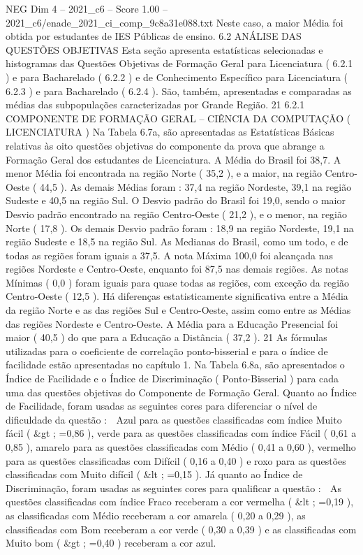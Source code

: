 \begin{textsample}{NEG Dim 4 – 2021\_c6 – Score 1.00 – 2021\_c6/enade\_2021\_ci\_comp\_9c8a31e088.txt}
Neste caso, a maior Média foi obtida por estudantes de IES Públicas de ensino. 6.2 ANÁLISE DAS QUESTÕES OBJETIVAS Esta seção apresenta estatísticas selecionadas e histogramas das Questões Objetivas de Formação Geral para Licenciatura ( 6.2.1 ) e para Bacharelado ( 6.2.2 ) e de Conhecimento Específico para Licenciatura ( 6.2.3 ) e para Bacharelado ( 6.2.4 ).
São, também, apresentadas e comparadas as médias das subpopulações caracterizadas por Grande Região. 21 6.2.1 COMPONENTE DE FORMAÇÃO GERAL – CIÊNCIA DA COMPUTAÇÃO ( LICENCIATURA ) Na Tabela 6.7a, são apresentadas as Estatísticas Básicas relativas às oito questões objetivas do componente da prova que abrange a Formação Geral dos estudantes de Licenciatura.
A Média do Brasil foi 38,7.
A menor Média foi encontrada na região Norte ( 35,2 ), e a maior, na região Centro-Oeste ( 44,5 ).
As demais Médias foram : 37,4 na região Nordeste, 39,1 na região Sudeste e 40,5 na região Sul.
O Desvio padrão do Brasil foi 19,0, sendo o maior Desvio padrão encontrado na região Centro-Oeste ( 21,2 ), e o menor, na região Norte ( 17,8 ).
Os demais Desvio padrão foram : 18,9 na região Nordeste, 19,1 na região Sudeste e 18,5 na região Sul.
As Medianas do Brasil, como um todo, e de todas as regiões foram iguais a 37,5.
A nota Máxima 100,0 foi alcançada nas regiões Nordeste e Centro-Oeste, enquanto foi 87,5 nas demais regiões.
As notas Mínimas ( 0,0 ) foram iguais para quase todas as regiões, com exceção da região Centro-Oeste ( 12,5 ).
Há diferenças estatisticamente significativa entre a Média da região Norte e as das regiões Sul e Centro-Oeste, assim como entre as Médias das regiões Nordeste e Centro-Oeste.
A Média para a Educação Presencial foi maior ( 40,5 ) do que para a Educação a Distância ( 37,2 ). 21 As fórmulas utilizadas para o coeficiente de correlação ponto-bisserial e para o índice de facilidade estão apresentadas no capítulo 1.
Na Tabela 6.8a, são apresentados o Índice de Facilidade e o Índice de Discriminação ( Ponto-Bisserial ) para cada uma das questões objetivas do Componente de Formação Geral.
Quanto ao Índice de Facilidade, foram usadas as seguintes cores para diferenciar o nível de dificuldade da questão :  Azul para as questões classificadas com índice Muito fácil ( \&gt ; =0,86 ), verde para as questões classificadas com índice Fácil ( 0,61 a 0,85 ), amarelo para as questões classificadas com Médio ( 0,41 a 0,60 ), vermelho para as questões classificadas com Difícil ( 0,16 a 0,40 ) e roxo para as questões classificadas com Muito difícil ( \&lt ; =0,15 ).
Já quanto ao Índice de Discriminação, foram usadas as seguintes cores para qualificar a questão :  As questões classificadas com índice Fraco receberam a cor vermelha ( \&lt ; =0,19 ), as classificadas com Médio receberam a cor amarela ( 0,20 a 0,29 ), as classificadas com Bom receberam a cor verde ( 0,30 a 0,39 ) e as classificadas com Muito bom ( \&gt ; =0,40 ) receberam a cor azul.

\end{textsample}
